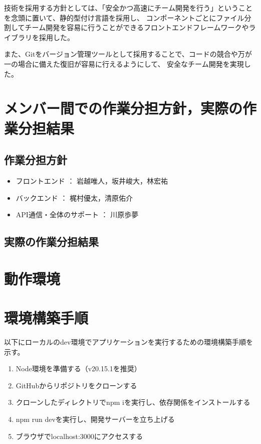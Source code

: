 \documentclass[a4j,titlepage]{jarticle}
\begin{document}
技術を採用する方針としては、「安全かつ高速にチーム開発を行う」ということを念頭に置いて、静的型付け言語を採用し、
コンポーネントごとにファイル分割してチーム開発を容易に行うことができるフロントエンドフレームワークやライブラリを採用した。

また、Gitをバージョン管理ツールとして採用することで、コードの競合や万が一の場合に備えた復旧が容易に行えるようにして、
安全なチーム開発を実現した。

\section{メンバー間での作業分担方針，実際の作業分担結果}

\subsection{作業分担方針}
\begin{itemize}
\item フロントエンド ： 岩越唯人，坂井峻大，林宏祐
\item バックエンド ： 梶村優太，清原佑介
\item API通信・全体のサポート ： 川原歩夢
\end{itemize}

\subsection{実際の作業分担結果}


\section{動作環境}

\section{環境構築手順}
以下にローカルのdev環境でアプリケーションを実行するための環境構築手順を示す。
\begin{enumerate}
\item Node環境を準備する（v20.15.1を推奨）
\item GitHubからリポジトリをクローンする
\item クローンしたディレクトリでnpm iを実行し、依存関係をインストールする
\item npm run devを実行し、開発サーバーを立ち上げる
\item ブラウザでlocalhost:3000にアクセスする
\end{enumerate}
\end{document}
